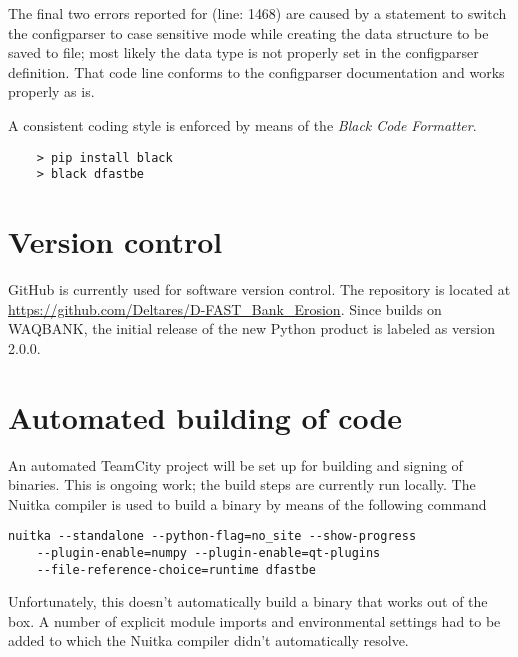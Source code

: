 The final two errors reported for  (line: 1468) are caused by a statement to switch the configparser to case sensitive mode while creating the data structure to be saved to file; most likely the data type is not properly set in the configparser definition.
That code line conforms to the configparser documentation and works properly as is.

A consistent coding style is enforced by means of the \emph{Black Code Formatter}.

\begin{Verbatim}
    > pip install black
    > black dfastbe
\end{Verbatim}

\section{Version control}

GitHub is currently used for software version control.
The repository is located at \url{https://github.com/Deltares/D-FAST_Bank_Erosion}.
Since \dfastbe builds on WAQBANK, the initial release of the new Python product is labeled as version 2.0.0.

\section{Automated building of code}

An automated TeamCity project will be set up for building and signing of binaries.
This is ongoing work; the build steps are currently run locally.
The Nuitka compiler is used to build a binary by means of the following command

\begin{Verbatim}
nuitka --standalone --python-flag=no_site --show-progress
    --plugin-enable=numpy --plugin-enable=qt-plugins
    --file-reference-choice=runtime dfastbe
\end{Verbatim}

Unfortunately, this doesn't automatically build a binary that works out of the box.
A number of explicit module imports and environmental settings had to be added to  which the Nuitka compiler didn't automatically resolve.

